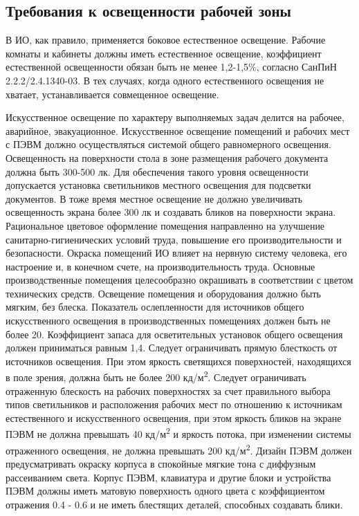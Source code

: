 \documentclass[utf8,usehyperref,12pt]{G7-32}
\begin{document}
\subsection{Требования к освещенности рабочей зоны}
В ИО, как правило, применяется боковое естественное освещение. Рабочие комнаты и кабинеты должны иметь естественное освещение, коэффициент естественной освещенности обязан быть не менее 1,2-1,5\%, согласно СанПиН 2.2.2/2.4.1340-03. В тех случаях, когда одного естественного освещения не хватает, устанавливается совмещенное освещение.

Искусственное освещение по характеру выполняемых задач делится на рабочее, аварийное, эвакуационное. 
Искусственное освещение помещений и рабочих мест с ПЭВМ должно осуществляться системой общего равномерного освещения. 
Освещенность на поверхности стола в зоне размещения рабочего документа должна быть 300-500 лк\cite{sp_hygienic}. Для обеспечения такого уровня освещенности допускается установка светильников местного освещения для подсветки документов. В тоже время местное освещение не должно увеличивать освещенность экрана более 300 лк и создавать бликов на поверхности экрана. 
Рациональное цветовое оформление помещения направленно на улучшение санитарно-гигиенических условий труда, повышение его производительности и безопасности. Окраска помещений ИО влияет на нервную систему человека, его настроение и, в конечном счете, на производительность труда. Основные производственные помещения целесообразно окрашивать в соответствии с цветом технических средств. Освещение помещения и оборудования должно быть мягким, без блеска. 
Показатель ослепленности для источников общего искусственного освещения в производственных помещениях должен быть не более 20. Коэффициент запаса для осветительных установок общего освещения должен приниматься равным 1,4. Следует ограничивать прямую блесткость от источников освещения. При этом яркость светящихся поверхностей, находящихся в поле зрения, должна быть не более 200 кд/м\textsuperscript{2}. 
Следует ограничивать отраженную блескость на рабочих поверхностях за счет правильного выбора типов светильников и расположения рабочих мест по отношению к источникам естественного и искусственного освещения, при этом яркость бликов 
на экране ПЭВМ не должна превышать 40 кд/м\textsuperscript{2} и яркость потока, при изменении системы отраженного освещения, не должна превышать 200 кд/м\textsuperscript{2}.
Дизайн ПЭВМ должен предусматривать окраску корпуса в спокойные мягкие тона с диффузным рассеиванием света. Корпус ПЭВМ, клавиатура и другие блоки и устройства ПЭВМ должны иметь матовую поверхность одного цвета с коэффициентом отражения 0.4 - 0.6 и не иметь блестящих деталей, способных создавать блики.
\end{document}
